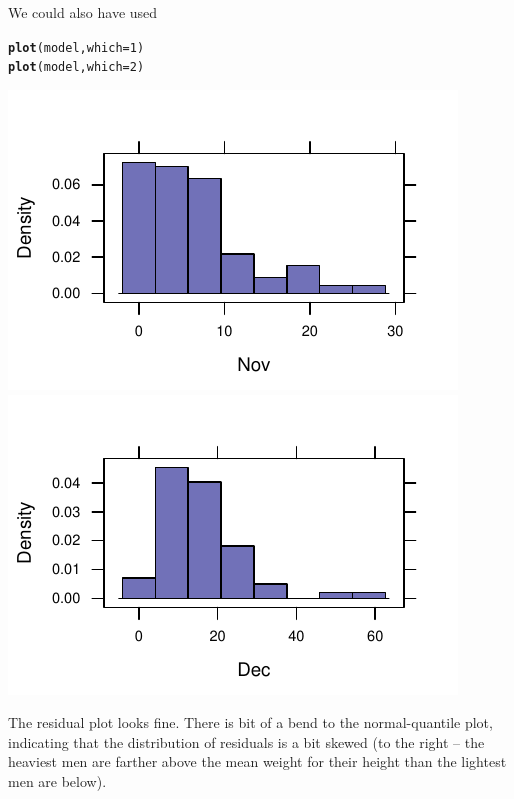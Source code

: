 \documentclass[twoside]{book}
\makeatletter
\def\maxwidth{ %
  \ifdim\Gin@nat@width>\linewidth
    \linewidth
  \else
    \Gin@nat@width
  \fi
}
\newcommand{\hlnum}[1]{\textcolor[rgb]{0.686,0.059,0.569}{#1}}%
\newcommand{\hlstd}[1]{\textcolor[rgb]{0.345,0.345,0.345}{#1}}%
\newcommand{\hlkwc}[1]{\textcolor[rgb]{0.333,0.667,0.333}{#1}}%
\newcommand{\hlkwd}[1]{\textcolor[rgb]{0.737,0.353,0.396}{\textbf{#1}}}%
\newenvironment{kframe}{%
 \def\at@end@of@kframe{}%
 \ifinner\ifhmode%
  \def\at@end@of@kframe{\end{minipage}}%
  \begin{minipage}{\columnwidth}%
 \fi\fi%
 \def\FrameCommand##1{\hskip\@totalleftmargin \hskip-\fboxsep
 \colorbox{shadecolor}{##1}\hskip-\fboxsep
     \hskip-\linewidth \hskip-\@totalleftmargin \hskip\columnwidth}%
 \MakeFramed {\advance\hsize-\width
   \@totalleftmargin\z@ \linewidth\hsize
   \@setminipage}}%
 {\par\unskip\endMakeFramed%
 \at@end@of@kframe}
\newenvironment{knitrout}{}{} %
\makeatother
\begin{document}
\begin{solution}
\begin{enumerate}
\begin{knitrout}
{}



\end{knitrout}
We could also have used
\begin{knitrout}
\color{fgcolor}\begin{kframe}
\begin{alltt}
\hlkwd{plot}\hlstd{(model,} \hlkwc{which} \hlstd{=} \hlnum{1}\hlstd{)}
\hlkwd{plot}\hlstd{(model,} \hlkwc{which} \hlstd{=} \hlnum{2}\hlstd{)}
\end{alltt}
\end{kframe}

{\centering \includegraphics[width=\maxwidth]{figures/fig-unnamed-chunk-38-1} 
\includegraphics[width=\maxwidth]{figures/fig-unnamed-chunk-38-2} 

}



\end{knitrout}
The residual plot looks fine.  There is bit of a bend to the normal-quantile plot, indicating
that the distribution of residuals is a bit skewed (to the right -- the heaviest men are farther above
the mean weight for their height than the lightest men are below).


\end{enumerate}
\end{solution}
\end{document}
